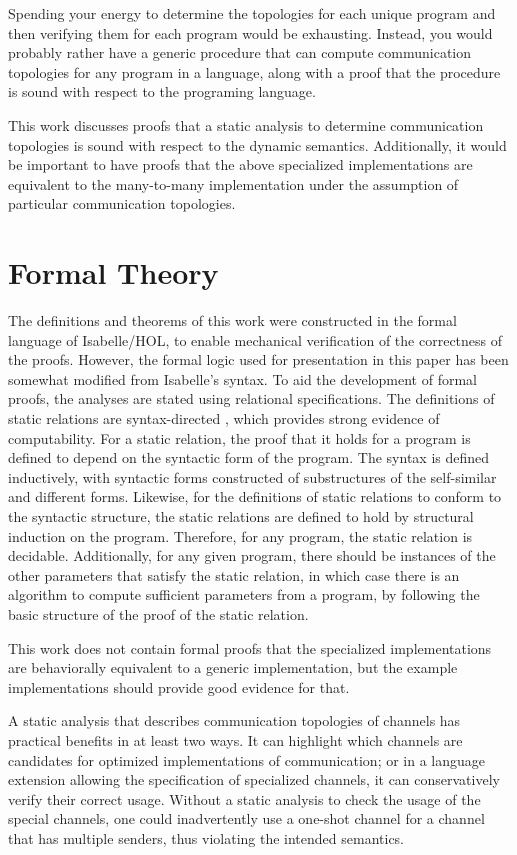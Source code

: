 \documentclass[10pt]{article}
\begin{document}
Spending your energy to determine the topologies for each unique program and then verifying
them for each program would be exhausting. Instead, you would probably rather have a generic
procedure that can compute communication topologies for any program in a language, along with
a proof that the procedure is sound with respect to the programing language.

This work discusses proofs that a static analysis to determine communication topologies is
sound with respect to the dynamic semantics.
Additionally, it would be important to have proofs that the above specialized
implementations are equivalent to the many-to-many implementation under the assumption of
particular communication topologies.

\section{Formal Theory}

The definitions and theorems of this work were constructed in the formal
language of Isabelle/HOL,
to enable mechanical verification of the correctness of the proofs.
However, the formal logic used
for presentation in this paper has been somewhat modified from Isabelle's syntax. 
To aid the development of formal proofs,
the analyses are stated using relational specifications.
The definitions of static relations are syntax-directed \cite{}, which provides
strong evidence of computability.
For a static relation, the proof that it holds for a program is defined
to depend on the syntactic form of the program.
The syntax is defined inductively, with syntactic forms constructed of 
substructures of the self-similar and different forms.   
Likewise, for the definitions of static relations to conform to the
syntactic structure, the static relations are defined to hold
by structural induction on the program.
Therefore, for any program, the static relation is decidable.
Additionally, for any given program, there should be instances of the other
parameters that satisfy the static relation, in which case there is an
algorithm to compute sufficient parameters from a program,
by following the basic structure of the proof of the static relation.

This work does not contain formal proofs that the specialized implementations are
behaviorally equivalent to a generic implementation, but the example implementations
should provide good evidence for that.

A static analysis that describes communication
topologies of channels has practical benefits in at least two ways.  It can highlight which
channels are candidates for optimized implementations of communication; or in a language
extension allowing the specification of specialized channels, it can conservatively verify
their correct usage. Without a static analysis to check the usage of the special channels, one
could inadvertently use a one-shot channel for a channel that has multiple senders, thus
violating the intended semantics. 
\end{document}
